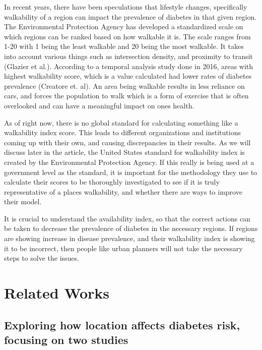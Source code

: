 \documentclass[
]{article}
\begin{document}
In recent years, there have been speculations that lifestyle changes,
specifically walkability of a region can impact the prevalence of
diabetes in that given region. The Environmental Protection Agency has
developed a standardized scale on which regions can be ranked based on
how walkable it is. The scale ranges from 1-20 with 1 being the least
walkable and 20 being the most walkable. It takes into account various
things such as intersection density, and proximity to transit (Glazier
et al.). According to a temporal analysis study done in 2016, areas with
highest walkability score, which is a value calculated had lower rates
of diabetes prevalence (Creatore et. al). An area being walkable results
in less reliance on cars, and forces the population to walk which is a
form of exercise that is often overlooked and can have a meaningful
impact on ones health.

As of right now, there is no global standard for calculating something
like a walkability index score. This leads to different organizations
and institutions coming up with their own, and causing discrepancies in
their results. As we will discuss later in the article, the United
States standard for walkability index is created by the Environmental
Protection Agency. If this really is being used at a government level as
the standard, it is important for the methodology they use to calculate
their scores to be thoroughly investigated to see if it is truly
representative of a places walkability, and whether there are ways to
improve their model.

It is crucial to understand the availability index, so that the correct
actions can be taken to decrease the prevalence of diabetes in the
necessary regions. If regions are showing increase in disease
prevalence, and their walkability index is showing it to be incorrect,
then people like urban planners will not take the necessary steps to
solve the issues.

\section{Related Works}\label{related-works}

\subsection{Exploring how location affects diabetes risk, focusing on
two
studies}\label{exploring-how-location-affects-diabetes-risk-focusing-on-two-studies}
\end{document}
